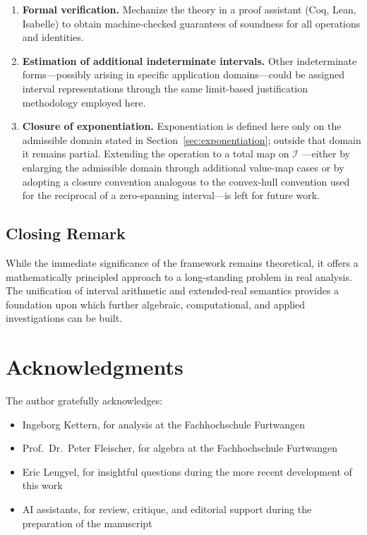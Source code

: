 \documentclass[11pt,a4paper]{article}
\theoremstyle{paperdef}
\newcommand{\Iset}{\mathcal{I}}
\begin{document}
\begin{enumerate}[leftmargin=2em]
  \item \textbf{Formal verification.} Mechanize the theory in a proof
    assistant (Coq, Lean, Isabelle) to obtain machine-checked
    guarantees of soundness for all operations and identities.

  \item \textbf{Estimation of additional indeterminate intervals.}
    Other indeterminate forms---possibly arising in specific
    application domains---could be assigned interval representations
    through the same limit-based justification methodology employed
    here.

  \item \textbf{Closure of exponentiation.} Exponentiation is defined
    here only on the admissible domain stated in
    Section~\ref{sec:exponentiation}; outside that domain it remains
    partial. Extending the operation to a total map on $\Iset$
    ---either by enlarging the admissible domain through additional
    value-map cases or by adopting a closure convention analogous to
    the convex-hull convention used for the reciprocal of a
    zero-spanning interval---is left for future work.
\end{enumerate}

\subsection{Closing Remark}

While the immediate significance of the framework remains
theoretical, it offers a mathematically principled approach to a
long-standing problem in real analysis. The unification of interval
arithmetic and extended-real semantics provides a foundation upon
which further algebraic, computational, and applied investigations
can be built.

\section*{Acknowledgments}

The author gratefully acknowledges:
\begin{itemize}[leftmargin=2em]
  \item Ingeborg Kettern, for analysis at the Fachhochschule
    Furtwangen
  \item Prof.\ Dr.\ Peter Fleischer, for algebra at the
    Fachhochschule Furtwangen
  \item Eric Lengyel, for insightful questions during the more
    recent development of this work
  \item AI assistants, for review, critique, and editorial support
    during the preparation of the manuscript
\end{itemize}
\end{document}
